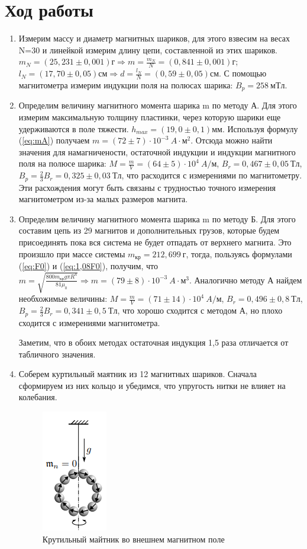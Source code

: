 \section{Ход работы}
\begin{enumerate}
    \item 

Измерим массу и диаметр магнитных шариков, для этого взвесим на весах N=30 и линейкой измерим длину цепи, составленной из этих шариков. $m_N=(25,231\pm0,001)г\Rightarrow m=\frac{m_N}{N}=(0,841\pm0,001)г$; $l_N=(17,70\pm0,05)см\Rightarrow d=\frac{l_N}{N}=(0,59\pm0,05)см$.
С помощью магнитометра измерим индукции поля на полюсах шарика: $B_p=258\ мТл$. 

\item Определим величину магнитного момента шарика m по методу А. Для этого измерим максимальную толщину пластинки, через которую шарики еще удерживаются в поле тяжести. $h_{max}=(19,0\pm0,1)мм$. Используя формулу (\ref{eq:mA}) получаем $m=(72\pm7)\cdot 10^{-3}\ A\cdot м^2$. Отсюда можно найти значения для намагничености, остаточной индукции и индукции магнитного поля на полюсе шарика: $M=\frac{m}{V}=(64\pm5)\cdot 10^{4}\ A/м$, $B_r=0,467\pm0,05\ Тл$, $B_p=\frac{2}{3}B_r=0,325\pm0,03\ Тл$, что расходится с измерениями по магнитометру. Эти расхождения могут быть связаны с трудностью точного измерения магнитометром из-за малых размеров магнита.
\item Определим величину магнитного момента шарика m по методу Б. Для этого составим цепь из 29 магнитов и дополнительных грузов, которые будем присоединять пока вся система не будет отпадать от верхнего магнита. Это произшло при массе системы $m_{кр}=212,699\ г$, тогда, пользуясь формулами (\ref{eq:F0}) и (\ref{eq:1,08F0}), получим, что $m=\sqrt{\frac{800m_{кр}g\pi R^4}{81\mu_0}}\Rightarrow m=(79\pm 8)\cdot10^{-3}\ A\cdot м^3$. Аналогично методу А найдем необхожимые величины: $M=\frac{m}{V}=(71\pm14)\cdot 10^{4}\ A/м$, $B_r=0,496\pm0,8\ Тл$, $B_p=\frac{2}{3}B_r=0,341\pm0,5\ Тл$, что хорошо сходится с методом А, но плохо сходится с измерениями магнитометра.

Заметим, что в обоих методах остаточная индукция 1,5 раза отличается от табличного значения. 
\item
Соберем куртильный маятник из 12 магнитных шариков. Сначала сформируем из них кольцо и убедимся, что упругость нитки не влияет на колебания. 
\begin{figure}[h!]
    \centering
    \includegraphics[]{circle.png}
    \caption{Крутильный майтник во внешнем магнитном поле}
\end{figure}


\end{enumerate}
